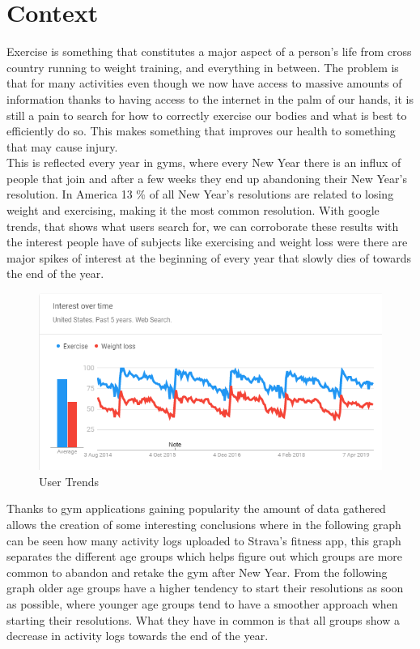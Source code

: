 \chapter{Context}\label{sec:chap:3}
Exercise is something that constitutes a major aspect of a person’s life from cross country running to weight training, and everything in between. The problem is that for many activities even though we now have access to massive amounts of information thanks to having access to the internet in the palm of our hands, it is still a pain to search for how to correctly exercise our bodies and what is best to efficiently do so. This makes something that improves our health to something that may cause injury.\\

 
This is reflected every year in gyms, where every New Year there is an influx of people that join and after a few weeks they end up abandoning their New Year’s resolution. In America 13 \% of all New Year’s resolutions are related to losing weight and exercising, making it the most common resolution. With google trends, that shows what users search for, we can corroborate these results with the interest people have of subjects like exercising and weight loss were there are major spikes of interest at the beginning of every year that slowly dies of towards the end of the year.\cite{newyear}


\begin{center}
	\begin{figure}[h!]
		\centering
		\includegraphics[scale=0.9]{./images/2-new-year-exercise}
		\caption{User Trends}
		\label{user-trends-gym}
	\end{figure}
\end{center}

Thanks to gym applications gaining popularity the amount of data gathered allows the creation of some interesting conclusions where in the following graph can be seen how many activity logs uploaded to Strava’s fitness app, this graph separates the different age groups which helps figure out which groups are more common to abandon and retake the gym after New Year. From the following graph older age groups have a higher tendency to start their resolutions as soon as possible, where younger age groups tend to have a smoother approach when starting their resolutions. What they have in common is that all groups show a decrease in activity logs towards the end of the year.\cite{newyear}\\

